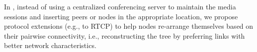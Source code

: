 In \cite{draft.rtcp.overlay}, instead of using a centralized conferencing
server to maintain the media sessions and inserting peers or nodes in the
appropriate location, we propose protocol extensions (e.g., to RTCP) to help
nodes re-arrange themselves based on their pairwise connectivity, i.e.,
reconstructing the tree by preferring links with better network
characteristics.

